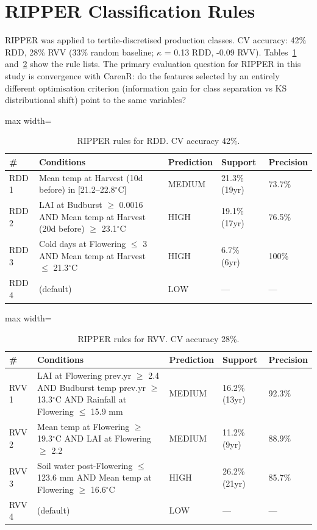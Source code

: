 \section{RIPPER Classification Rules}\label{sec:ripper_classification_rules}

RIPPER was applied to tertile-discretised production classes. CV accuracy: 42\% RDD, 28\% RVV (33\% random baseline; $\kappa$ = 0.13 RDD, -0.09 RVV). Tables~\ref{tab:ch4a_5} and~\ref{tab:ch4a_6} show the rule lists. The primary evaluation question for RIPPER in this study is convergence with CarenR: do the features selected by an entirely different optimisation criterion (information gain for class separation vs KS distributional shift) point to the same variables?

\begin{table}[htbp]
  \centering
  \caption{RIPPER rules for RDD. CV accuracy 42\%.}\label{tab:ch4a_5}
  \small
  \begin{adjustbox}{max width=\textwidth}
    \begin{tabularx}{\textwidth}{l|p{4.5cm}|l|l|X}
  \toprule
  \# & Conditions & Prediction & Support & Precision \\
  \midrule
  RDD 1 & Mean temp at Harvest (10d before) in [21.2--22.8$^\circ$C] & MEDIUM & 21.3\% (19yr) & 73.7\% \\
  RDD 2 & LAI at Budburst $\geq$ 0.0016
AND Mean temp at Harvest (20d before) $\geq$ 23.1$^\circ$C & HIGH & 19.1\% (17yr) & 76.5\% \\
  RDD 3 & Cold days at Flowering $\leq$ 3
AND Mean temp at Harvest $\leq$ 21.3$^\circ$C & HIGH & 6.7\% (6yr) & 100\% \\
  RDD 4 & (default) & LOW & --- & --- \\
  \bottomrule
\end{tabularx}
  \end{adjustbox}

\end{table}


\begin{table}[htbp]
  \centering
  \caption{RIPPER rules for RVV. CV accuracy 28\%.}\label{tab:ch4a_6}
  \small
  \begin{adjustbox}{max width=\textwidth}
    \begin{tabularx}{\textwidth}{l|p{4.5cm}|l|l|X}
  \toprule
  \# & Conditions & Prediction & Support & Precision \\
  \midrule
  RVV 1 & LAI at Flowering prev.yr $\geq$ 2.4
AND Budburst temp prev.yr $\geq$ 13.3$^\circ$C
AND Rainfall at Flowering $\leq$ 15.9 mm & MEDIUM & 16.2\% (13yr) & 92.3\% \\
  RVV 2 & Mean temp at Flowering $\geq$ 19.3$^\circ$C
AND LAI at Flowering $\geq$ 2.2 & MEDIUM & 11.2\% (9yr) & 88.9\% \\
  RVV 3 & Soil water post-Flowering $\leq$ 123.6 mm
AND Mean temp at Flowering $\geq$ 16.6$^\circ$C & HIGH & 26.2\% (21yr) & 85.7\% \\
  RVV 4 & (default) & LOW & --- & --- \\
  \bottomrule
\end{tabularx}
  \end{adjustbox}

\end{table}


